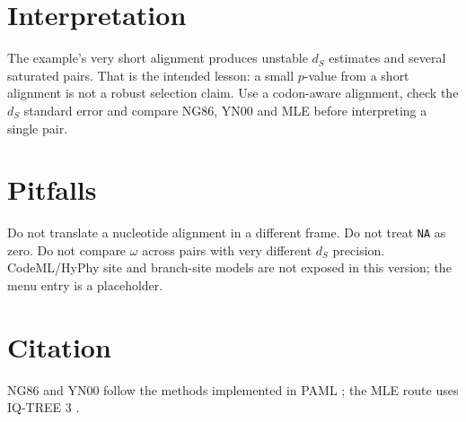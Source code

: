 \documentclass[11pt]{report}
\begin{document}
\section{Interpretation}
The example's very short alignment produces unstable $d_S$ estimates and
several saturated pairs. That is the intended lesson: a small $p$-value from
a short alignment is not a robust selection claim. Use a codon-aware
alignment, check the $d_S$ standard error and compare NG86, YN00 and MLE
before interpreting a single pair.

\section{Pitfalls}
Do not translate a nucleotide alignment in a different frame. Do not treat
\texttt{NA} as zero. Do not compare $\omega$ across pairs with very different
$d_S$ precision. CodeML/HyPhy site and branch-site models are not exposed in
this version; the menu entry is a placeholder.

\section{Citation}
NG86 and YN00 follow the methods implemented in PAML \cite{paml}; the MLE
route uses IQ-TREE 3 \cite{iqtree3}.

\nocite{*}
\printbibliography
\end{document}
